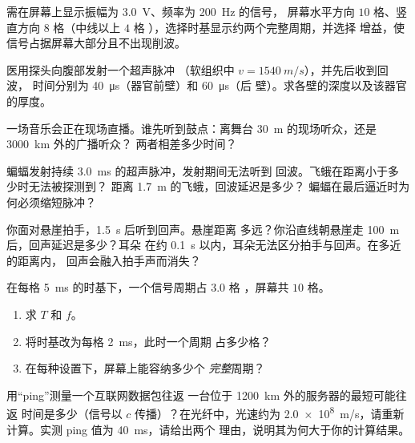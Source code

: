 \begin{exercise}[$\star\star$]\label{exo:g10:signals-and-waves:9}
需在屏幕上显示振幅为 \qty{3.0}{V}、频率为 \qty{200}{Hz} 的信号，
屏幕水平方向 $10$ 格、竖直方向 $8$ 格（中线以上 $4$ 格
），选择时基显示约两个完整周期，并选择
增益，使信号占据屏幕大部分且不出现削波。
\end{exercise}

\begin{exercise}[$\star\star$]\label{exo:g10:signals-and-waves:10}
医用探头向腹部发射一个超声脉冲
（软组织中 $v = \qty{1540}{m/s}$），并先后收到回波，
时间分别为 \qty{40}{\micro s}（器官前壁）和 \qty{60}{\micro s}（后
壁）。求各壁的深度以及该器官的厚度。
\end{exercise}

\begin{exercise}[$\star\star$]\label{exo:g10:signals-and-waves:11}
一场音乐会正在现场直播。谁先听到鼓点：离舞台
\qty{30}{m} 的现场听众，还是 \qty{3000}{km} 外的广播听众？
两者相差多少时间？
\end{exercise}

\begin{exercise}[$\star\star\star$]\label{exo:g10:signals-and-waves:12}
蝙蝠发射持续 \qty{3.0}{ms} 的超声脉冲，发射期间无法听到
回波。飞蛾在距离小于多少时无法被探测到？
距离 \qty{1.7}{m} 的飞蛾，回波延迟是多少？
蝙蝠在最后逼近时为何必须缩短脉冲？
\end{exercise}

\begin{exercise}[$\star\star\star$]\label{exo:g10:signals-and-waves:13}
你面对悬崖拍手，\qty{1.5}{s} 后听到回声。悬崖距离
多远？你沿直线朝悬崖走 \qty{100}{m} 后，回声延迟是多少？耳朵
在约 \qty{0.1}{s} 以内，耳朵无法区分拍手与回声。在多近的距离内，
回声会融入拍手声而消失？
\end{exercise}

\begin{exercise}[$\star\star\star$]\label{exo:g10:signals-and-waves:14}
在每格 \qty{5}{ms} 的时基下，一个信号周期占 $3.0$ 格
，屏幕共 $10$ 格。
\begin{enumerate}
  \item 求 $T$ 和 $f$。
  \item 将时基改为每格 \qty{2}{ms}，此时一个周期
        占多少格？
  \item 在每种设置下，屏幕上能容纳多少个
        \emph{完整}周期？
\end{enumerate}
\end{exercise}

\begin{exercise}[$\star\star\star$]\label{exo:g10:signals-and-waves:15}
用“ping”测量一个互联网数据包往返
一台位于 \qty{1200}{km} 外的服务器的最短可能往返
时间是多少（信号以 $c$ 传播）？在光纤中，光速约为
\qty{2.0e8}{m/s}，请重新计算。实测 ping 值为 \qty{40}{ms}，请给出两个
理由，说明其为何大于你的计算结果。
\end{exercise}

